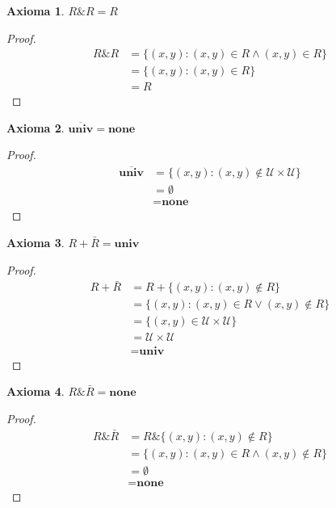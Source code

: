 \documentclass{article}
\newtheorem*{axiom}{Axioma}
\newcommand{\U}{\mathcal{U}}
\newcommand{\none}{\textbf{none}}
\newcommand{\univ}{\textbf{univ}}
\begin{document}
\begin{axiom}
  $R \& R = R$
\end{axiom}
\begin{proof}
  \begin{equation*}
    \begin{aligned}
      R \& R &= \{(x, y) : (x, y) \in R \land (x, y) \in R\} \\ 
             &= \{(x, y) : (x, y) \in R\} \\ 
             &= R
    \end{aligned}
  \end{equation*}
\end{proof}

\begin{axiom}
  $\overline{\univ} = \none$
\end{axiom}
\begin{proof}
  \begin{equation*}
    \begin{aligned}
      \overline{\univ} &= \{(x, y) : (x, y) \notin \U \times \U\} \\ 
                       &= \emptyset \\ 
                       &= \none
    \end{aligned}
  \end{equation*}
\end{proof}

\begin{axiom}
  $R + \bar{R} = \univ$
\end{axiom}
\begin{proof}
  \begin{equation*}
    \begin{aligned}
      R + \bar{R} &= R + \{(x, y) : (x, y) \notin R\} \\ 
                  &= \{(x, y) : (x, y) \in R \lor (x, y) \notin R\} \\ 
                  &= \{(x, y) \in \U \times \U\} \\ 
                  &= \U \times \U \\ 
                  &= \univ
    \end{aligned}
  \end{equation*}
\end{proof}

\begin{axiom}
  $R \& \bar{R} = \none$
\end{axiom}
\begin{proof}
  \begin{equation*}
    \begin{aligned}
      R \& \bar{R} &= R \& \{(x, y) : (x, y) \notin R\} \\ 
                   &= \{(x, y) : (x, y) \in R \land (x, y) \notin R\} \\ 
                   &= \emptyset \\ 
                   &= \none
    \end{aligned}
  \end{equation*}
\end{proof}
\end{document}
